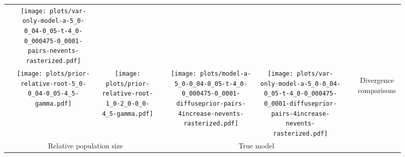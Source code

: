 \documentclass[border=10pt,varwidth=30cm]{standalone}
\begin{document}
\begin{figure}
\begin{tabular}{@{}cccccccc@{}}
        & \texttt{[image: plots/var-only-model-a-5\_0-0\_04-0\_05-t-4\_0-0\_000475-0\_0001-pairs-nevents-rasterized.pdf]}
        & \multicolumn{1}{c|}{}
        & \\
        & \texttt{[image: plots/prior-relative-root-5\_0-0\_04-0\_05-4\_5-gamma.pdf]}
        & \texttt{[image: plots/prior-relative-root-1\_0-2\_0-0\_0-4\_5-gamma.pdf]}
        &
        & \texttt{[image: plots/model-a-5\_0-0\_04-0\_05-t-4\_0-0\_000475-0\_0001-diffuseprior-pairs-4increase-nevents-rasterized.pdf]}
        & \texttt{[image: plots/var-only-model-a-5\_0-0\_04-0\_05-t-4\_0-0\_000475-0\_0001-diffuseprior-pairs-4increase-nevents-rasterized.pdf]}
        & \multicolumn{1}{c|}{}
        & \multirow{5}{*}[16.5em]{\begin{sideways}\Large Divergence comparisons\end{sideways}} \\
        & \multicolumn{2}{c}{\large Relative population size}
        &
        & \multicolumn{2}{c}{\large True model}
        &
        & \\
    \end{tabular}
\end{figure}
\end{document}
